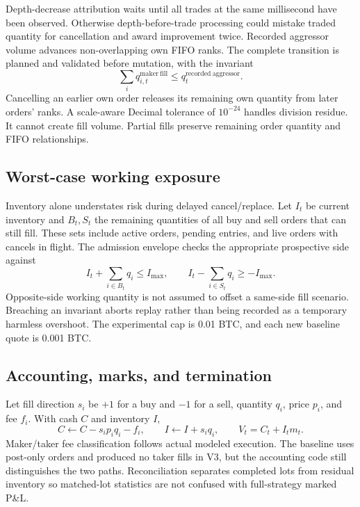 Depth-decrease attribution waits until all trades at the same millisecond have
been observed. Otherwise depth-before-trade processing could mistake traded
quantity for cancellation and award improvement twice. Recorded aggressor
volume advances non-overlapping own FIFO ranks. The complete transition is
planned and validated before mutation, with the invariant
\begin{equation}
 \sum_i q_{i,t}^{\mathrm{maker\ fill}}
 \le q_t^{\mathrm{recorded\ aggressor}}.
\end{equation}
Cancelling an earlier own order releases its remaining own quantity from later
orders' ranks. A scale-aware Decimal tolerance of $10^{-24}$ handles division
residue. It cannot create fill volume. Partial fills preserve remaining order
quantity and FIFO relationships.

\subsection{Worst-case working exposure}

Inventory alone understates risk during delayed cancel/replace. Let $I_t$ be
current inventory and $B_t,S_t$ the remaining quantities of all buy and sell
orders that can still fill. These sets include active orders, pending entries,
and live orders with cancels in flight. The admission envelope checks the
appropriate prospective side against
\begin{equation}
 I_t+\sum_{i\in B_t}q_i\le I_{\max},\qquad
 I_t-\sum_{i\in S_t}q_i\ge-I_{\max}.
\end{equation}
Opposite-side working quantity is not assumed to offset a same-side fill
scenario. Breaching an invariant aborts replay rather than being recorded as a
temporary harmless overshoot. The experimental cap is 0.01 BTC, and each new
baseline quote is 0.001 BTC.

\subsection{Accounting, marks, and termination}

Let fill direction $s_i$ be $+1$ for a buy and $-1$ for a sell, quantity $q_i$,
price $p_i$, and fee $f_i$. With cash $C$ and inventory $I$,
\begin{equation}
 C\leftarrow C-s_i p_iq_i-f_i,\qquad I\leftarrow I+s_iq_i,
 \qquad V_t=C_t+I_tm_t.
\end{equation}
Maker/taker fee classification follows actual modeled execution. The baseline
uses post-only orders and produced no taker fills in V3, but the accounting
code still distinguishes the two paths. Reconciliation separates completed
lots from residual inventory so matched-lot statistics are not confused with
full-strategy marked P\&L.

